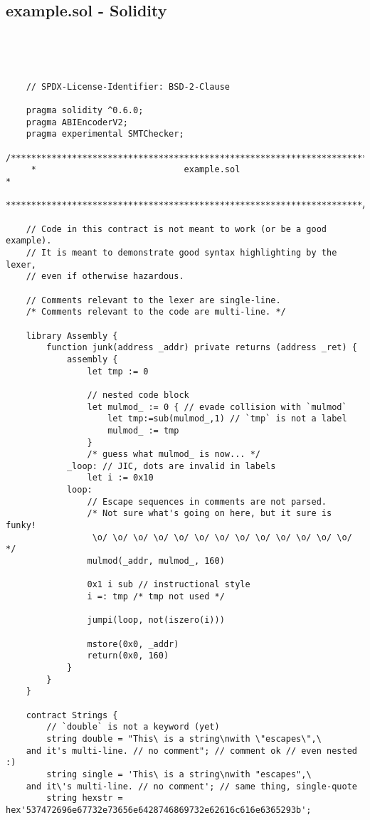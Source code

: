 \documentclass[runningheads]{llncs}
\begin{document}
\subsection{example.sol - Solidity}
\begin{verbatim}




    // SPDX-License-Identifier: BSD-2-Clause

    pragma solidity ^0.6.0;
    pragma ABIEncoderV2;
    pragma experimental SMTChecker;
    /**********************************************************************
     *                             example.sol                            *
     **********************************************************************/
    
    // Code in this contract is not meant to work (or be a good example).
    // It is meant to demonstrate good syntax highlighting by the lexer,
    // even if otherwise hazardous.
    
    // Comments relevant to the lexer are single-line.
    /* Comments relevant to the code are multi-line. */
    
    library Assembly {
        function junk(address _addr) private returns (address _ret) {
            assembly {
                let tmp := 0
    
                // nested code block
                let mulmod_ := 0 { // evade collision with `mulmod`
                    let tmp:=sub(mulmod_,1) // `tmp` is not a label
                    mulmod_ := tmp
                }
                /* guess what mulmod_ is now... */
            _loop: // JIC, dots are invalid in labels
                let i := 0x10
            loop:
                // Escape sequences in comments are not parsed.
                /* Not sure what's going on here, but it sure is funky!
                 \o/ \o/ \o/ \o/ \o/ \o/ \o/ \o/ \o/ \o/ \o/ \o/ \o/ */
                mulmod(_addr, mulmod_, 160)
                
                0x1 i sub // instructional style
                i =: tmp /* tmp not used */
                
                jumpi(loop, not(iszero(i)))
                
                mstore(0x0, _addr)
                return(0x0, 160)
            }
        }
    }
    
    contract Strings {
        // `double` is not a keyword (yet)
        string double = "This\ is a string\nwith \"escapes\",\
    and it's multi-line. // no comment"; // comment ok // even nested :)
        string single = 'This\ is a string\nwith "escapes",\
    and it\'s multi-line. // no comment'; // same thing, single-quote
        string hexstr = hex'537472696e67732e73656e6428746869732e62616c616e6365293b';
    

\end{verbatim}
\end{document}
